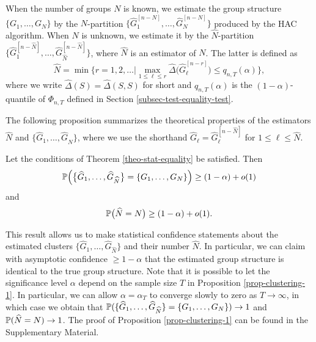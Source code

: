When the number of groups $N$ is known, we estimate the group structure $\{G_1,\ldots, G_N\}$ by the $N$-partition $\{\widehat{G}_1^{[n-N]},\ldots,\widehat{G}_{N}^{[n-N]}\}$ produced by the HAC algorithm. When $N$ is unknown, we estimate it by the $\widehat{N}$-partition $\{\widehat{G}_1^{[n-\widehat{N}]},\ldots,\widehat{G}_{\widehat{N}}^{[n-\widehat{N}]}\}$, where $\widehat{N}$ is an estimator of $N$. The latter is defined as 
\[ \widehat{N} = \min \Big\{ r = 1,2,\ldots \Big| \max_{1 \le \ell \le r} \widehat{\Delta} \big( \widehat{G}_\ell^{[n-r]} \big) \le q_{n,T}(\alpha) \Big\}, \]
where we write $\widehat{\Delta}(S) = \widehat{\Delta}(S,S)$ for short and $q_{n,T}(\alpha)$ is the $(1-\alpha)$-quantile of $\Phi_{n,T}$ defined in Section \ref{subsec-test-equality-test}. 


The following proposition summarizes the theoretical properties of the estimators $\widehat{N}$ and $\{ \widehat{G}_1,\ldots,\widehat{G}_{\widehat{N}} \}$, where we use the shorthand $\widehat{G}_\ell = \widehat{G}_\ell^{[n-\widehat{N}]}$ for $1 \le \ell \le \widehat{N}$. 
\begin{prop}\label{prop-clustering-1}
Let the conditions of Theorem \ref{theo-stat-equality} be satisfied. Then 
\[ \mathbb{P} \Big( \big\{ \widehat{G}_1,\ldots,\widehat{G}_{\widehat{N}} \big\} = \{ G_1,\ldots,G_N \} \Big) \ge (1-\alpha) + o(1) \]
and 
\[ \mathbb{P} \big( \widehat{N} = N \big) \ge (1-\alpha) + o(1). \]
\end{prop}
This result allows us to make statistical confidence statements about the estimated clusters $\{ \widehat{G}_1,\ldots,\widehat{G}_{\widehat{N}} \}$ and their number $\widehat{N}$. In particular, we can claim with asymptotic confidence $\ge 1 - \alpha$ that the estimated group structure is identical to the true group structure. Note that it is possible to let the significance level $\alpha$ depend on the sample size $T$ in Proposition \ref{prop-clustering-1}. In particular, we can allow $\alpha = \alpha_T$ to converge slowly to zero as $T \rightarrow \infty$, in which case we obtain that $\mathbb{P} ( \{ \widehat{G}_1,\ldots,\widehat{G}_{\widehat{N}} \} = \{ G_1,\ldots,G_N \} ) \rightarrow 1$ and $\mathbb{P} ( \widehat{N} = N ) \rightarrow 1$. The proof of Proposition \ref{prop-clustering-1} can be found in the Supplementary Material.   


